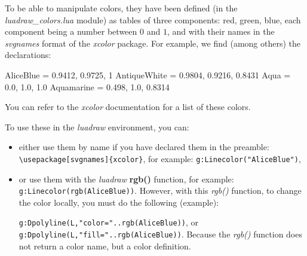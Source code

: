 To be able to manipulate colors, they have been defined (in the \emph{luadraw\_colors.lua} module) as tables of three components: red, green, blue, each component being a number between $0$ and $1$, and with their names in the \emph{svgnames} format of the \emph{xcolor} package. For example, we find (among others) the declarations:

\begin{Luacode}
AliceBlue = {0.9412, 0.9725, 1}
AntiqueWhite = {0.9804, 0.9216, 0.8431}
Aqua = {0.0, 1.0, 1.0}
Aquamarine = {0.498, 1.0, 0.8314}
\end{Luacode}
You can refer to the \emph{xcolor} documentation for a list of these colors.

To use these in the \emph{luadraw} environment, you can:
\begin{itemize}
    \item either use them by name if you have declared them in the preamble: \verb|\usepackage[svgnames]{xcolor}|, for example: \texttt{g:Linecolor("AliceBlue")},

    \item or use them with the \emph{luadraw} \textbf{rgb()} function, for example: \texttt{g:Linecolor(rgb(AliceBlue))}. However, with this \emph{rgb()} function, to change the color locally, you must do the following (example): \par
\texttt{g:Dpolyline(L,"color="..rgb(AliceBlue))}, or \texttt{g:Dpolyline(L,"fill="..rgb(AliceBlue))}. Because the \emph{rgb()} function does not return a color name, but a color definition.
\end{itemize}

